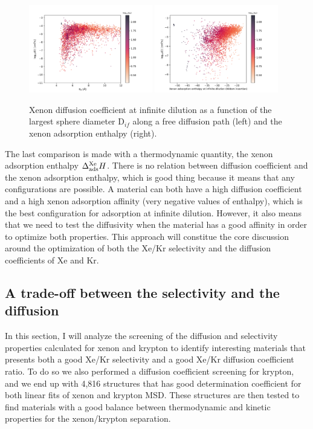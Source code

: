 \documentclass[main]{subfiles}
\begin{document}
\begin{figure}[ht]
  \centering
    \includegraphics[width=0.48\textwidth]{figures/5-diffusion/D_log-lcd_s_+.pdf}
    \includegraphics[width=0.48\textwidth]{figures/5-diffusion/D_log-H_Xe_s_+.pdf}
    \caption{Xenon diffusion coefficient at infinite dilution as a function of the largest sphere diameter D$_{if}$ along a free diffusion path (left) and the xenon adsorption enthalpy (right). }\label{fgr:diff_H_lcd}
\end{figure}

The last comparison is made with a thermodynamic quantity, the xenon adsorption enthalpy $\Delta_{\text{ads}}^{\text{Xe}}H$. There is no relation between diffusion coefficient and the xenon adsorption enthalpy, which is good thing because it means that any configurations are possible. A material can both have a high diffusion coefficient and a high xenon adsorption affinity (very negative values of enthalpy), which is the best configuration for adsorption at infinite dilution. However, it also means that we need to test the diffusivity when the material has a good affinity in order to optimize both properties. This approach will constitue the core discussion around the optimization of both the Xe/Kr selectivity and the diffusion coefficients of Xe and Kr.  

\subsection{A trade-off between the selectivity and the diffusion}

In this section, I will analyze the screening of the diffusion and selectivity properties calculated for xenon and krypton to identify interesting materials that presents both a good Xe/Kr selectivity and a good Xe/Kr diffusion coefficient ratio. To do so we also performed a diffusion coefficient screening for krypton, and we end up with 4,816 structures that has good determination coefficient for both linear fits of xenon and krypton MSD. These structures are then tested to find materials with a good balance between thermodynamic and kinetic properties for the xenon/krypton separation.
\end{document}
